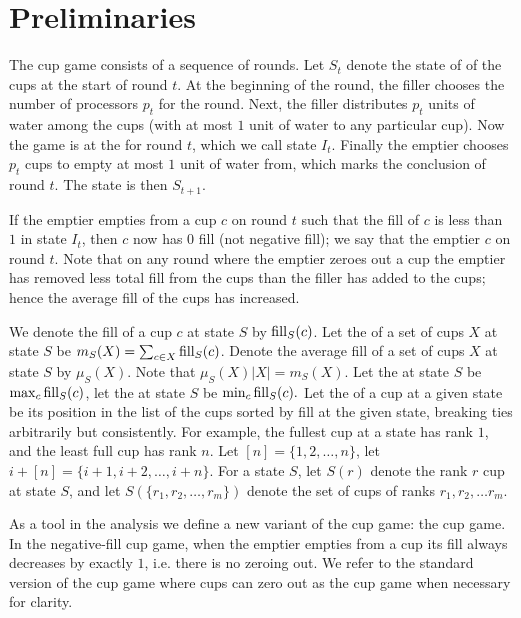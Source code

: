 \section{Preliminaries}\label{sec:prelims}
The cup game consists of a sequence of rounds. Let $S_t$ denote the state of of the cups at the start of round $t$. At the beginning of the round, the filler chooses the number
of processors $p_t$ for the round. Next, the filler distributes
$p_t$ units of water among the cups (with at most $1$ unit of
water to any particular cup). Now the game is at the
 for round $t$, which we call state $I_t$.
Finally the emptier chooses $p_t$ cups to empty at most $1$ unit
of water from, which marks the conclusion of round $t$. The state
is then $S_{t+1}$.

If the emptier empties from a cup $c$ on round $t$ such that the fill
of $c$ is less than $1$ in state $I_t$, then $c$ now has $0$ fill (not
negative fill); we say that the emptier  $c$ on round
$t$. Note that on any round where the emptier zeroes out a cup the
emptier has removed less total fill from the cups than the filler has
added to the cups; hence the average fill of the cups has increased.

We denote the fill of a cup $c$ at state $S$ by $\operatorname{\text{\textup{fill}}}_S(c)$. Let
the  of a set of cups $X$ at state $S$ be $m_S(X) =
\sum_{c\in X} \operatorname{\text{\textup{fill}}}_S(c)$. Denote the average fill of a set of
cups $X$ at state $S$ by $\mu_S(X)$. Note that $\mu_S(X) |X| =
m_S(X)$. Let the  at state $S$ be $\max_c
\operatorname{\text{\textup{fill}}}_S(c)$, let the  at state $S$ be $\min_c
\operatorname{\text{\textup{fill}}}_S(c).$
Let the  of a cup at a given state be its position in
the list of the cups sorted by fill at the given state, breaking
ties arbitrarily but consistently. For example, the fullest cup
at a state has rank $1$, and the least full cup has rank $n$. Let
$[n] = \{1,2,\ldots, n\}$, let $i+[n] = \{i+1, i+2, \ldots,
i+n\}$. For a state $S$, let $S(r)$ denote the rank $r$ cup at
state $S$, and let $S(\{r_1,r_2,\ldots, r_m\})$ denote the set of
cups of ranks $r_1, r_2,\ldots r_m$.

As a tool in the analysis we define a new variant of the cup
game: the  cup game. In the negative-fill cup
game, when the emptier empties from a cup its fill always
decreases by exactly $1$, i.e. there is no zeroing out. We refer
to the standard version of the cup game where cups can zero out
as the  cup game when necessary for clarity.


